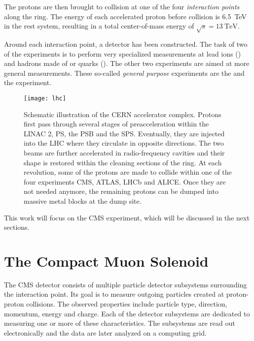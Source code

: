 The protons are then brought to collision at one of the four \emph{interaction points} along the ring. The energy of each accelerated proton before collision is \SI{6.5}{\TeV} in the rest system, resulting in a total center-of-mass energy of $\sqrt{s} = \SI{13}{\TeV}$.

Around each interaction point, a detector has been constructed. The task of two of the experiments is to perform very specialized measurements at lead ions () and hadrons made of \Pcharm or \Pbottom quarks (). 
The other two experiments are aimed at more general measurements. These so-called \emph{general purpose} experiments are the  and the  experiment\cite{Evans:LHCMachine}. 

\begin{figure}
    \centering
    \texttt{[image: lhc]}
    \caption{Schematic illustration of the \acs{CERN} accelerator complex\cite{Ley:CERNAccelerators,Caron:LHCLayout,DeMelis:CERNacceleratorcomplex}. Protons first pass through several stages of preacceleration within the \ac{LINAC} 2, \ac{PS}, the \ac{PSB} and the \ac{SPS}. Eventually, they are injected into the \ac{LHC} where they circulate in opposite directions. The two beams are further accelerated in radio-frequency cavities and their shape is restored within the cleaning sections of the ring. At each revolution, some of the protons are made to collide within one of the four experiments \acs{CMS}, \acs{ATLAS}, \acs{LHCb} and \acs{ALICE}. Once they are not needed anymore, the remaining protons can be dumped into massive metal blocks at the dump site.
    }
    \label{fig:LHC}
\end{figure}

This work will focus on the \ac{CMS} experiment, which will be discussed in the next sections.

\section{The Compact Muon Solenoid}
The \ac{CMS} detector consists of multiple particle detector subsystems surrounding the interaction point.
Its goal is to measure outgoing particles created at proton-proton collisions.
The observed properties include particle type, direction, momentum, energy and charge. Each of the detector subsystems are dedicated to measuring one or more of these characteristics. The subsystems are read out electronically and the data are later analyzed on a computing grid.

